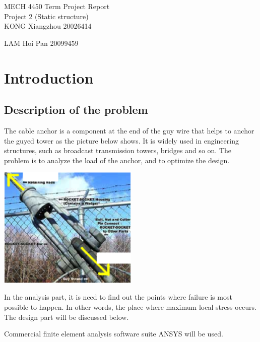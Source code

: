 \documentclass[a4paper,14pt]{extarticle}
\begin{document}
\begin{center}
{\LARGE MECH 4450 Term Project Report}\\\vspace{2em}
{\Large Project 2 (Static structure)}\\\vspace{2em}
{\Large KONG Xiangzhou 20026414}

{\Large LAM Hoi Pan 20099459}\\\vspace{1em}
\end{center}

\tableofcontents

\section{Introduction}
\subsection{Description of the problem}
The cable anchor is a component at the end of the guy wire that helps to anchor the guyed tower as the picture below shows. It is widely used in engineering structures, such as broadcast transmission towers, bridges and so on. The problem is to analyze the load of the anchor, and to optimize the design.

\begin{center}\includegraphics[width=0.5\textwidth]{DESCRIPTION.png}\end{center}

In the analysis part, it is need to find out the points where failure is most possible to happen. In other words, the place where maximum local stress occurs. The design part will be discussed below.

Commercial finite element analysis software suite ANSYS will be used.
\end{document}
